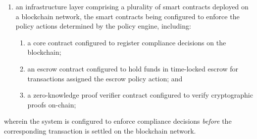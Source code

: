 \documentclass[12pt,a4paper]{article}
\begin{document}
\begin{enumerate}[label=\textbf{\arabic*.}]
\begin{enumerate}[label=(\alph*)]
\item an infrastructure layer comprising a plurality of smart contracts 
deployed on a blockchain network, the smart contracts being configured to 
enforce the policy actions determined by the policy engine, including:
\begin{enumerate}[label=(\roman*)]
\item a core contract configured to register compliance decisions on the 
blockchain;
\item an escrow contract configured to hold funds in time-locked escrow for 
transactions assigned the escrow policy action; and
\item a zero-knowledge proof verifier contract configured to verify 
cryptographic proofs on-chain;
\end{enumerate}
\end{enumerate}
wherein the system is configured to enforce compliance decisions 
\emph{before} the corresponding transaction is settled on the blockchain 
network.


\end{enumerate}
\end{document}
